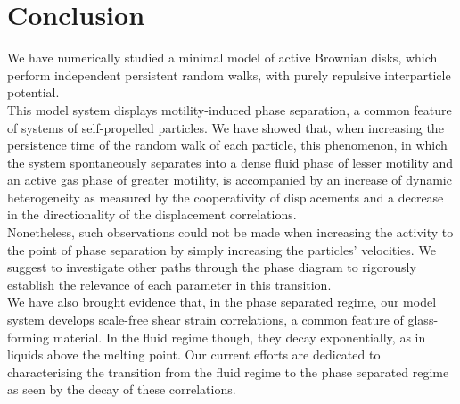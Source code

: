 \documentclass[class=report, float=false, crop=false]{standalone}
\begin{document}
\chapter*{Conclusion}
\label{conclusion}

We have numerically studied a minimal model of active Brownian disks, which perform independent persistent random walks, with purely repulsive interparticle potential.\\

This model system displays motility-induced phase separation, a common feature of systems of self-propelled particles. We have showed that, when increasing the persistence time of the random walk of each particle, this phenomenon, in which the system spontaneously separates into a dense fluid phase of lesser motility and an active gas phase of greater motility, is accompanied by an increase of dynamic heterogeneity as measured by the cooperativity of displacements and a decrease in the directionality of the displacement correlations.\\

Nonetheless, such observations could not be made when increasing the activity to the point of phase separation by simply increasing the particles' velocities. We suggest to investigate other paths through the phase diagram to rigorously establish the relevance of each parameter in this transition.\\

We have also brought evidence that, in the phase separated regime, our model system develops scale-free shear strain correlations, a common feature of glass-forming material. In the fluid regime though, they decay exponentially, as in liquids above the melting point. Our current efforts are dedicated to characterising the transition from the fluid regime to the phase separated regime as seen by the decay of these correlations.
\end{document}
